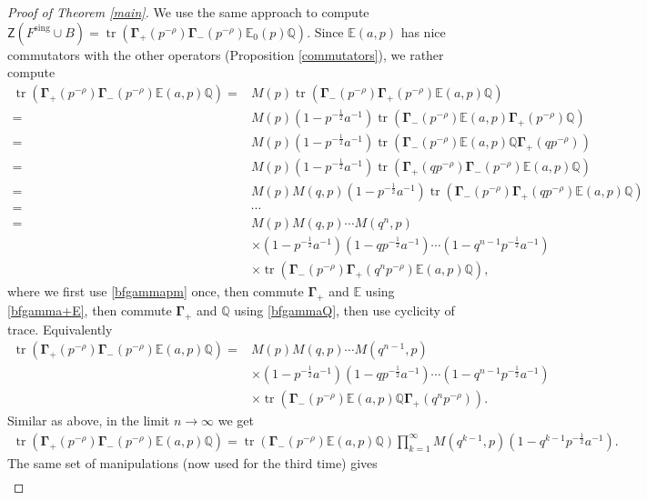 \documentclass{amsart}
\theoremstyle{definition}
\newcommand{\QQ} {\mathbb{Q}}		%
\newcommand{\bfGamma} {\mathbf{\Gamma}}
\newcommand{\sing}{\mathrm{sing}}
\newcommand{\EE}{\mathbb{E}}
\newcommand{\sfZ} {\mathsf{Z}}
\newcommand{\tr}{\operatorname{tr}}
\begin{document}
\begin{proof}[Proof of Theorem \ref{main}]
We use the same approach to compute $\sfZ(F^{\sing} \cup B) = \tr(\bfGamma_+(p^{-\rho}) \bfGamma_-(p^{-\rho}) \EE_0(p) \QQ)$. Since $\EE(a,p)$ has nice commutators with the other operators (Proposition \ref{commutators}), we rather compute
\begin{align*}
\tr(\bfGamma_+(p^{-\rho}) \bfGamma_-(p^{-\rho}) \EE(a,p) \QQ) =& M(p) \tr(\bfGamma_-(p^{-\rho}) \bfGamma_+(p^{-\rho}) \EE(a,p) \QQ) \\
=& M(p) (1-p^{-\frac{1}{2}} a^{-1}) \tr(\bfGamma_-(p^{-\rho}) \EE(a,p) \bfGamma_+(p^{-\rho}) \QQ) \\
=& M(p) (1-p^{-\frac{1}{2}} a^{-1}) \tr(\bfGamma_-(p^{-\rho}) \EE(a,p) \QQ \bfGamma_+(q p^{-\rho}) ) \\
=& M(p) (1-p^{-\frac{1}{2}} a^{-1}) \tr(\bfGamma_+(q p^{-\rho}) \bfGamma_-(p^{-\rho}) \EE(a,p) \QQ ) \\
=& M(p) M(q,p) (1-p^{-\frac{1}{2}} a^{-1}) \tr(\bfGamma_-(p^{-\rho}) \bfGamma_+(q p^{-\rho}) \EE(a,p) \QQ ) \\
=& \cdots \\
=& M(p) M(q,p) \cdots M(q^n,p) \\
&\times (1-p^{-\frac{1}{2}} a^{-1}) (1-q p^{-\frac{1}{2}} a^{-1}) \cdots (1-q^{n-1} p^{-\frac{1}{2}} a^{-1}) \\
&\times \tr(\bfGamma_-(p^{-\rho}) \bfGamma_+(q^n p^{-\rho}) \EE(a,p) \QQ ),
\end{align*}
where we first use \eqref{bfgammapm} once, then commute $\bfGamma_+$ and $\EE$ using \eqref{bfgamma+E}, then commute $\bfGamma_+$ and $\QQ$ using \eqref{bfgammaQ}, then use cyclicity of trace. Equivalently
\begin{align*}
\tr(\bfGamma_+(p^{-\rho}) \bfGamma_-(p^{-\rho}) \EE(a,p) \QQ) =& M(p) M(q,p) \cdots M(q^{n-1},p) \\
&\times (1-p^{-\frac{1}{2}} a^{-1}) (1-q p^{-\frac{1}{2}} a^{-1}) \cdots (1-q^{n-1} p^{-\frac{1}{2}} a^{-1}) \\
&\times \tr(\bfGamma_-(p^{-\rho}) \EE(a,p) \QQ \bfGamma_+(q^n p^{-\rho})).
\end{align*}
Similar as above, in the limit $n \rightarrow \infty$ we get
\begin{align*}
\tr(\bfGamma_+(p^{-\rho}) \bfGamma_-(p^{-\rho}) \EE(a,p) \QQ) = \tr(\bfGamma_-(p^{-\rho}) \EE(a,p) \QQ) \prod_{k=1}^{\infty} M(q^{k-1},p) (1-q^{k-1} p^{-\frac{1}{2}} a^{-1}).
\end{align*}
The same set of manipulations (now used for the third time) gives
\begin{align*}

\end{align*}
\end{proof}
\end{document}
